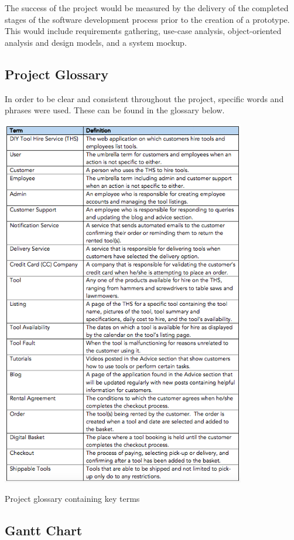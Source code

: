 \documentclass[fontsize=11pt]{extarticle}
\numberwithin{figure}{section} %
\numberwithin{table}{section}%
\begin{document}
The success of the project would be measured by the delivery of the
completed stages of the software development process prior to the
creation of a prototype. This would include requirements gathering,
use-case analysis, object-oriented analysis and design models, and a
system mockup.

\hypertarget{project-glossary}{%
\subsection{Project Glossary}\label{project-glossary}}

In order to be clear and consistent throughout the project, specific
words and phrases were used. These can be found in the glossary below.

\begin{table}[H]
      \centering
      \includegraphics[trim = 0 0 0 0, clip, width=0.8\textwidth]{TempImg/glossary.png}
      \caption{Project glossary containing key terms}
\label{conreq}
 \end{table}

\hypertarget{gantt-chart}{%
\subsection{Gantt Chart}\label{gantt-chart}}
\end{document}
